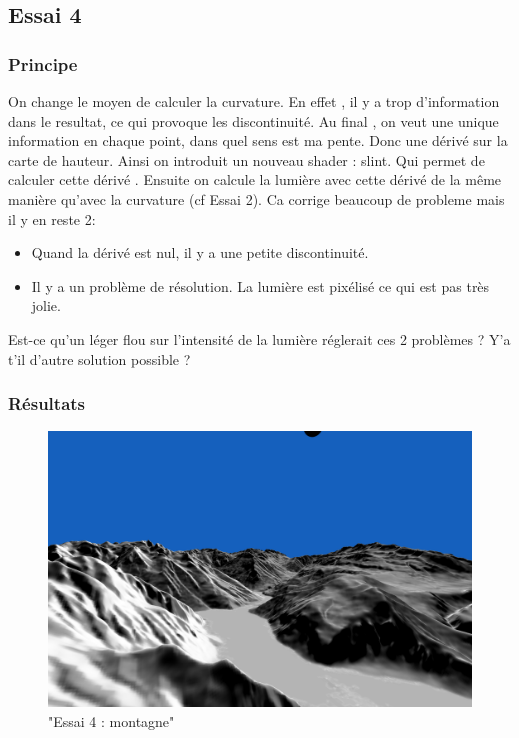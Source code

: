 \documentclass[a4paper]{article}
\begin{document}
\subsection{Essai 4}


\subsubsection{Principe}
On change le moyen de calculer la curvature. En effet , il y a trop d'information dans le resultat, ce qui provoque les discontinuité. Au final , on veut une unique information en chaque point, dans quel sens est ma pente. Donc une dérivé sur la carte de hauteur.
Ainsi on introduit un nouveau shader : slint. Qui permet de calculer cette dérivé . Ensuite on calcule la lumière avec cette dérivé de la même manière qu'avec la curvature (cf Essai 2). 
Ca corrige beaucoup de probleme mais il y en reste 2: 
\begin{itemize}
\item Quand la dérivé est nul, il y a une petite discontinuité.
\item Il y a un problème de résolution. La lumière est pixélisé ce qui est pas très jolie.
\end{itemize}
Est-ce qu'un léger flou sur l'intensité de la lumière réglerait ces 2 problèmes ? Y'a t'il d'autre solution possible ?

\subsubsection{Résultats}


\begin{figure}[thb]
	\centering
    \includegraphics[scale=0.3]{Images/Essais/Essai_4_mount.png}
    \caption{"Essai 4 : montagne"}
 \end{figure}
\end{document}
